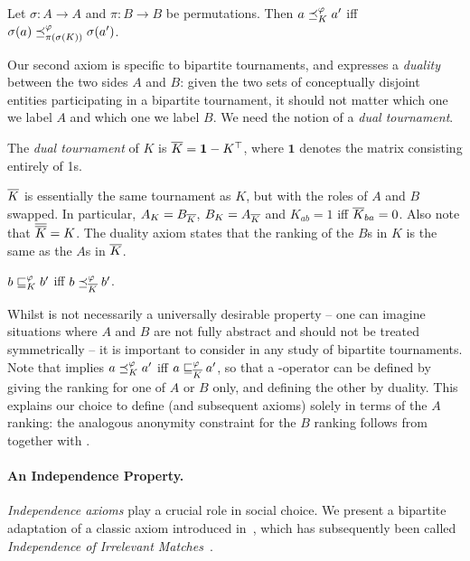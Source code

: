 \begin{axiom}[\anon{}]
    Let $\sigma:A \to A$ and $\pi:B \to B$ be permutations. Then $a \preceq_K^\varphi
    a'$ iff $\sigma(a) \preceq_{\pi(\sigma(K))}^\varphi \sigma(a')$.
\end{axiom}

Our second axiom is specific to bipartite tournaments, and expresses a
\emph{duality} between the two sides $A$ and $B$: given the two sets of
conceptually disjoint entities participating in a bipartite tournament, it
should not matter which one we label $A$ and which one we label $B$. We need
the notion of a \emph{dual tournament}.

\begin{definition}%

    The \emph{dual tournament} of $K$ is ${\overline{K}} = \bm{1} - K^\top$, where
    $\bm{1}$ denotes the matrix consisting entirely of 1s.

\end{definition}

${\overline{K}}$ is essentially the same tournament as $K$, but with the roles of $A$
and $B$ swapped. In particular, $A_K = B_{\overline{K}}$, $B_K = A_{\overline{K}}$ and
$K_{ab} = 1$ iff ${\overline{K}}_{ba} = 0$. Also note that ${\overline{{\overline{K}}}} = K$.
The duality axiom states that the ranking of the $B$s in $K$ is the same as the
$A$s in ${\overline{K}}$.

\begin{axiom}[\dualaxiom{}]
    $b \sqsubseteq_K^\varphi b'$ iff $b \preceq_{\overline{K}}^\varphi b'$.
\end{axiom}

Whilst \dualaxiom{} is not necessarily a universally desirable property --
one can imagine situations where $A$ and $B$ are not fully abstract and should
not be treated symmetrically -- it is important to consider in any study of
bipartite tournaments. Note that \dualaxiom{} implies $a \preceq_K^\varphi
a'$ iff $a \sqsubseteq_{{\overline{K}}}^\varphi a'$, so that a \dualaxiom{}-operator can be
defined by giving the ranking for one of $A$ or $B$ only, and defining the
other by duality. This explains our choice to define \anon{} (and
subsequent axioms) solely in terms of the $A$ ranking: the analogous anonymity
constraint for the $B$ ranking follows from \anon{} together with
\dualaxiom{}.

\paragraph{An Independence Property.}
%
\emph{Independence axioms} play a crucial role in social choice. We present a
bipartite adaptation of a classic axiom introduced
in~\cite{rubinstein1980ranking}, which has subsequently been called
\emph{Independence of Irrelevant Matches}~\cite{gonzalez2014paired}.

